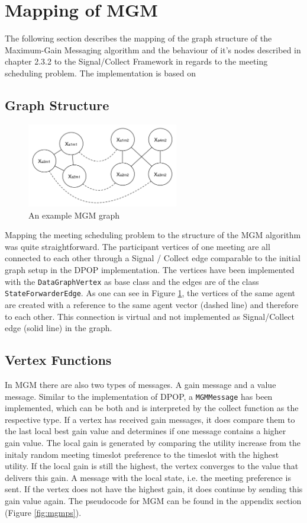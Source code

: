 \section{Mapping of MGM}

The following section describes the mapping of the graph structure of the Maximum-Gain Messaging algorithm and the behaviour of it's nodes described in chapter 2.3.2 to the Signal/Collect Framework in regards to the meeting scheduling problem. The implementation is based on \cite{Chapman2010}

\subsection{Graph Structure}
\begin{figure}[H]
\includegraphics[width=250px]{graphics/mgm_graph}
\centering
\caption{An example MGM graph}
\label{fig:mgm_graph}
\end{figure}

Mapping the meeting scheduling problem to the structure of the MGM algorithm was quite straightforward. The participant vertices of one meeting are all connected to each other through a Signal / Collect edge comparable to the initial graph setup in the DPOP implementation. The vertices have been implemented with the \texttt{DataGraphVertex} as base class and the edges are of the class \texttt{StateForwarderEdge}. As one can see in Figure \ref{fig:mgm_graph}, the vertices of the same agent are created with a reference to the same agent vector (dashed line) and therefore to each other. This connection is virtual and not implemented as Signal/Collect edge (solid line) in the graph.

\subsection{Vertex Functions}
In MGM there are also two types of messages. A gain message and a value message. Similar to the implementation of DPOP, a \texttt{MGMMessage} has been implemented, which can be both and is interpreted by the collect function as the respective type. If a vertex has received gain messages, it does compare them to the last local best gain value and determines if one message contains a higher gain value. The local gain is generated by comparing the utility increase from the initaly random meeting timeslot preference to the timeslot with the highest utility. If the local gain is still the highest, the vertex converges to the value that delivers this gain. A message with the local state, i.e. the meeting preference is sent. If the vertex does not have the highest gain, it does continue by sending this gain value again. The pseudocode for MGM can be found in the appendix section (Figure \ref{fig:mgmps}).

